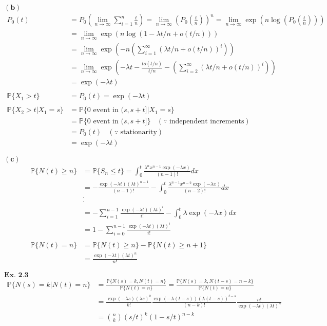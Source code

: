 \documentclass{article}
\begin{document}
$\mathbf{(b)}$
\begin{align*}
P_{0}(t) &= P_{0}\left(\lim_{n\rightarrow \infty} \sum_{i=1}^{n}\frac{t}{n}\right) = \lim_{n \rightarrow \infty} \left(P_{0}\left(\frac{t}{n}\right)\right)^n = \lim_{n \rightarrow \infty} \exp\left(n\log\left(P_{0}\left(\frac{t}{n}\right)\right)\right)\\
&= \lim_{n \rightarrow \infty} \exp(n\log(1-\lambda t/n + o(t/n)))\\
&= \lim_{n \rightarrow \infty} \exp\left(-n\left(\sum_{i=1}^{\infty}(\lambda t/n + o(t/n))^i\right)\right)\\
&= \lim_{n \rightarrow \infty} \exp\left(-\lambda t - \frac{to(t/n)}{t/n} - \left(\sum_{i=2}^{\infty}(\lambda t/n + o(t/n))^i\right)\right)\\
&= \exp(-\lambda t)\\\\
\mathbb{P}\{X_1>t\} &= P_0(t) = \exp(-\lambda t)\\\\
\mathbb{P}\{X_2 > t | X_1 = s\} &= \mathbb{P}\{0 \text{ event in }(s,s+t]|X_1 = s\}\\
&=  \mathbb{P}\{0 \text{ event in }(s,s+t]\} \ \ \ \ (\because \text{ independent increments})\\
&= P_{0}(t) \ \ \ \ (\because \text{ stationarity})\\
&= \exp(-\lambda t)
\end{align*}

$\mathbf{(c)}$
\begin{align*}
\mathbb{P}\{N(t) \geq n\} &= \mathbb{P}\{S_{n} \leq t\} = \int_{0}^{t}\frac{\lambda^n x^{n-1}\exp(-\lambda x)}{(n-1)!}dx\\
&= -\frac{\exp(-\lambda t) (\lambda t)^{n-1}}{(n-1)!} - \int_{0}^{t}\frac{\lambda^{n-1} x^{n-2}\exp(-\lambda x)}{(n-2)!}dx\\
&.\\
&.\\
&= -\sum_{i=1}^{n-1}\frac{\exp(-\lambda t) (\lambda t)^{i}}{i!} - \int_{0}^{t}\lambda\exp(-\lambda x)dx\\
&= 1-\sum_{i=0}^{n-1}\frac{\exp(-\lambda t) (\lambda t)^{i}}{i!}\\\\
\mathbb{P}\{N(t) = n\} &= \mathbb{P}\{N(t) \geq n\} - \mathbb{P}\{N(t) \geq n+1\}\\
&= \frac{\exp(-\lambda t) (\lambda t)^{n}}{n!}
\end{align*}

\vspace{0.2in}
${\textbf{Ex. 2.3}}$
\begin{align*}
\mathbb{P}\{N(s) = k | N(t) = n\} &= \frac{\mathbb{P}\{N(s) = k, N(t) = n\}}{\mathbb{P}\{N(t)=n\}} = \frac{\mathbb{P}\{N(s) = k, N(t-s) = n-k\}}{\mathbb{P}\{N(t)=n\}}\\
&= \frac{\exp(-\lambda s)(\lambda s)^k}{k!}\frac{\exp(-\lambda (t-s))(\lambda(t-s))^{t-s}}{(n-k)!}\frac{n!}{\exp(-\lambda t)(\lambda t)^n}\\
&= \binom{n}{k}(s/t)^k(1-s/t)^{n-k}
\end{align*}
\end{document}
